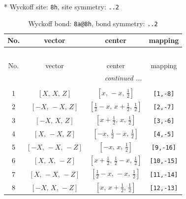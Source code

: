 \documentclass[fleqn,8pt]{jsarticle}
\begin{document}
* Wyckoff site: {\tt 8h}, site symmetry: {\tt ..2}
\renewcommand{\arraystretch}{1.2}
\begin{longtable}{cccc}
\caption{Wyckoff bond: {\tt 8a@8h}, bond symmetry: {\tt ..2}}
 \\
 \hline \hline
No. & vector & center & mapping \\ \hline \endfirsthead

\multicolumn{3}{l}{\tablename\ \thetable{}} \\
 \hline \hline
No. & vector & center & mapping \\ \hline \endhead

 \hline \hline
\multicolumn{3}{r}{\footnotesize\it continued ...} \\ \endfoot

 \hline \hline
\multicolumn{3}{r}{} \\ \endlastfoot

1 & $\left[ X,\, X,\, Z \right]$ & $\left[ x,\, - x,\, \frac{1}{2} \right]$ & {\tt [1,-8]} \\ \hline
2 & $\left[ - X,\, - X,\, Z \right]$ & $\left[ \frac{1}{2} - x,\, x + \frac{1}{2},\, \frac{1}{2} \right]$ & {\tt [2,-7]} \\ \hline
3 & $\left[ - X,\, X,\, Z \right]$ & $\left[ x + \frac{1}{2},\, x,\, \frac{1}{2} \right]$ & {\tt [3,-6]} \\ \hline
4 & $\left[ X,\, - X,\, Z \right]$ & $\left[ - x,\, \frac{1}{2} - x,\, \frac{1}{2} \right]$ & {\tt [4,-5]} \\ \hline
5 & $\left[ - X,\, - X,\, - Z \right]$ & $\left[ - x,\, x,\, \frac{1}{2} \right]$ & {\tt [9,-16]} \\ \hline
6 & $\left[ X,\, X,\, - Z \right]$ & $\left[ x + \frac{1}{2},\, \frac{1}{2} - x,\, \frac{1}{2} \right]$ & {\tt [10,-15]} \\ \hline
7 & $\left[ X,\, - X,\, - Z \right]$ & $\left[ \frac{1}{2} - x,\, - x,\, \frac{1}{2} \right]$ & {\tt [11,-14]} \\ \hline
8 & $\left[ - X,\, X,\, - Z \right]$ & $\left[ x,\, x + \frac{1}{2},\, \frac{1}{2} \right]$ & {\tt [12,-13]} \\
\end{longtable}
\renewcommand{\arraystretch}{1.2}
\end{document}
